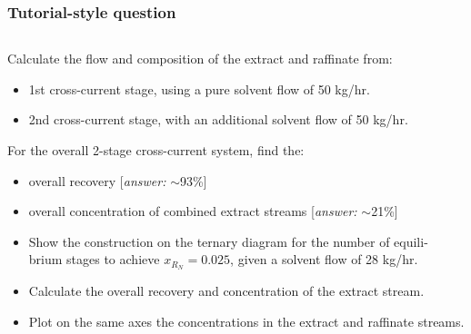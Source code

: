 \begin{frame}\frametitle{Tutorial-style question}
	\begin{exampleblock}{}
		{\color{myBlue}{Consider a system for which you have been given the ternary diagram (see next slides). $A$ = solute, $S$ = solvent (100\% pure), $C$~=~carrier.
		The feed, $F$ enters at 112 kg/hr with composition of 25~wt\% solute and 75 wt\% carrier.	}}
	\end{exampleblock}
	\vspace{-16pt}
	\begin{columns}[t]
			\begin{enumerate}		
				{\color{myLightGrey}
				\item	Calculate the flow and composition of the extract and raffinate from:
				\begin{itemize}
					\item	{\color{myLightGrey}1st cross-current stage, using a pure solvent flow of 50 kg/hr.}
					\item	{\color{myLightGrey}2nd cross-current stage, with an additional solvent flow of 50 kg/hr.}
				\end{itemize}
				\item	For the overall 2-stage cross-current system, find the:
				\begin{itemize}
					\item	{\color{myLightGrey}overall recovery {\small \color{myOrange}[\emph{answer:} $\sim$93\%]}}
					\item	{\color{myLightGrey}overall concentration of combined extract streams {\small \color{myOrange}[\emph{answer:} $\sim$21\%]}}
				\end{itemize}}				
				\item	{}
				\begin{itemize}
					\item	Show the construction on the ternary diagram for the number of equili- brium stages to achieve $x_{R_N} = 0.025$, given a solvent flow of 28 kg/hr.
					\item	Calculate the overall recovery and concentration of the extract stream.
					\item	Plot on the same axes the concentrations in the extract and raffinate streams.
				\end{itemize}
			\end{enumerate}
	\end{columns}	
\end{frame}

